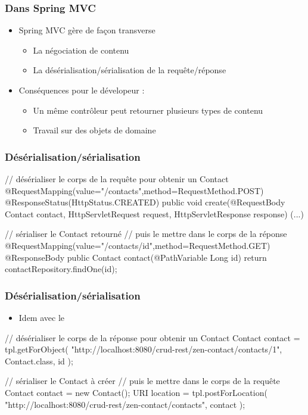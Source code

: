 \begin{frame}
 \frametitle{Dans Spring MVC}
 \begin{itemize}
  \item Spring MVC gère de façon transverse
  \begin{itemize}
   \item La négociation de contenu
   \item La désérialisation/sérialisation de la requête/réponse
  \end{itemize}
  \item Conséquences pour le dévelopeur :
  \begin{itemize}
   \item Un même contrôleur peut retourner plusieurs types de contenu
   \item Travail sur des objets de domaine
  \end{itemize}
 \end{itemize}

\end{frame}

\begin{frame}[fragile]
 \frametitle{Désérialisation/sérialisation}
 
 \begin{javacode}
// d\'es\'erialiser le corps de la requ\^ete pour obtenir un Contact
@RequestMapping(value="/contacts",method=RequestMethod.POST)
@ResponseStatus(HttpStatus.CREATED)
public void create(@RequestBody Contact contact, 
                   HttpServletRequest request, 
                   HttpServletResponse response) {
  (...)
}

// s\'erialiser le Contact retourn\'e
// puis le mettre dans le corps de la r\'eponse
@RequestMapping(value="/contacts/{id}",method=RequestMethod.GET)
@ResponseBody
public Contact contact(@PathVariable Long id) {    
  return contactRepository.findOne(id);
}
 \end{javacode}

\end{frame}

\begin{frame}[fragile]
 \frametitle{Désérialisation/sérialisation}
 
 \begin{itemize}
  \item Idem avec le 
 \end{itemize}

 
 \begin{javacode}
// d\'es\'erialiser le corps de la r\'eponse pour obtenir un Contact
Contact contact = tpl.getForObject(
  "http://localhost:8080/crud-rest/zen-contact/contacts/1", 
  Contact.class,
  id
);

// s\'erialiser le Contact \`a cr\'eer
// puis le mettre dans le corps de la requ\^ete
Contact contact = new Contact();
URI location = tpl.postForLocation(
  "http://localhost:8080/crud-rest/zen-contact/contacts",
  contact
);
 \end{javacode}

\end{frame}

